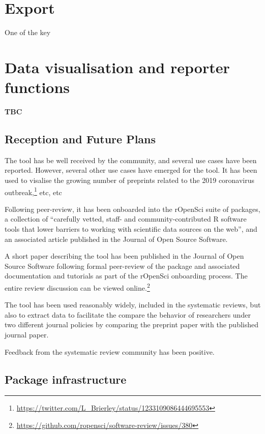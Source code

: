 \documentclass[a4paper, twoside]{templates/ociamthesis}
\begin{document}
\hypertarget{export}{%
\section{Export}\label{export}}

One of the key

\hypertarget{data-visualisation-and-reporter-functions}{%
\section{Data visualisation and reporter functions}\label{data-visualisation-and-reporter-functions}}

\textbf{TBC}

\hypertarget{reception-and-future-plans-1}{%
\subsection{Reception and Future Plans}\label{reception-and-future-plans-1}}

The tool has be well received by the community, and several use cases have been reported. However, several other use cases have emerged for the tool. It has been used to visalise the growing number of preprints related to the 2019 coronavirus outbreak,\footnote{\url{https://twitter.com/L_Brierley/status/1233109086444695553}} etc, etc

Following peer-review, it has been onboarded into the rOpenSci suite of packages, a collection of ``carefully vetted, staff- and community-contributed R software tools that lower barriers to working with scientific data sources on the web'', and an associated article published in the Journal of Open Source Software.

A short paper describing the tool has been published in the Journal of Open Source Software following formal peer-review of the package and associated documentation and tutorials as part of the rOpenSci onboarding process. The entire review discussion can be viewed online.\footnote{\url{https://github.com/ropensci/software-review/issues/380}}

The tool has been used reasonably widely, included in the systematic reviews, but also to extract data to facilitate the compare the behavior of researchers under two different journal policies by comparing the preprint paper with the published journal paper.

Feedback from the systematic review community has been positive.

\hypertarget{package-infrastructure}{%
\subsection{Package infrastructure}\label{package-infrastructure}}
\end{document}

